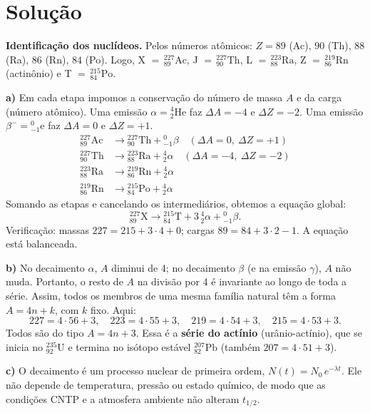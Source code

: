 \documentclass{article}%
\begin{document}
\section*{Solução}

\textbf{Identificação dos nuclídeos.} Pelos números atômicos: $Z=89$ (Ac), $90$ (Th), $88$ (Ra), $86$ (Rn), $84$ (Po). Logo, X $=\,^{227}_{89}\text{Ac}$, J $=\,^{227}_{90}\text{Th}$, L $=\,^{223}_{88}\text{Ra}$, Z $=\,^{219}_{86}\text{Rn}$ (actinônio) e T $=\,^{215}_{84}\text{Po}$.

\medskip
\textbf{a)} Em cada etapa impomos a conservação do número de massa $A$ e da carga (número atômico). Uma emissão $\alpha={}^{4}_{2}\text{He}$ faz $\Delta A=-4$ e $\Delta Z=-2$. Uma emissão $\beta^-={}^{0}_{-1}\text{e}$ faz $\Delta A=0$ e $\Delta Z=+1$.
\begin{align*}
{}^{227}_{89}\text{Ac} &\longrightarrow {}^{227}_{90}\text{Th} + {}^{0}_{-1}\beta \quad (\Delta A=0,\ \Delta Z=+1)\\
{}^{227}_{90}\text{Th} &\longrightarrow {}^{223}_{88}\text{Ra} + {}^{4}_{2}\alpha \quad (\Delta A=-4,\ \Delta Z=-2)\\
{}^{223}_{88}\text{Ra} &\longrightarrow {}^{219}_{86}\text{Rn} + {}^{4}_{2}\alpha\\
{}^{219}_{86}\text{Rn} &\longrightarrow {}^{215}_{84}\text{Po} + {}^{4}_{2}\alpha
\end{align*}
Somando as etapas e cancelando os intermediários, obtemos a equação global:
\[
{}^{227}_{89}\text{X} \longrightarrow {}^{215}_{84}\text{T} + 3\,{}^{4}_{2}\alpha + {}^{0}_{-1}\beta .
\]
Verificação: massas $227 = 215 + 3\cdot 4 + 0$; cargas $89 = 84 + 3\cdot 2 - 1$. A equação está balanceada.

\medskip
\textbf{b)} No decaimento $\alpha$, $A$ diminui de 4; no decaimento $\beta$ (e na emissão $\gamma$), $A$ não muda. Portanto, o resto de $A$ na divisão por 4 é invariante ao longo de toda a série. Assim, todos os membros de uma mesma família natural têm a forma $A=4n+k$, com $k$ fixo. Aqui:
\[
227=4\cdot 56+3,\quad 223=4\cdot 55+3,\quad 219=4\cdot 54+3,\quad 215=4\cdot 53+3 .
\]
Todos são do tipo $A=4n+3$. Essa é a \textbf{série do actínio} (urânio-actínio), que se inicia no ${}^{235}_{92}\text{U}$ e termina no isótopo estável ${}^{207}_{82}\text{Pb}$ (também $207=4\cdot 51+3$).

\medskip
\textbf{c)} O decaimento é um processo nuclear de primeira ordem, $N(t)=N_0\,e^{-\lambda t}$. Ele não depende de temperatura, pressão ou estado químico, de modo que as condições CNTP e a atmosfera ambiente não alteram $t_{1/2}$.
\end{document}
